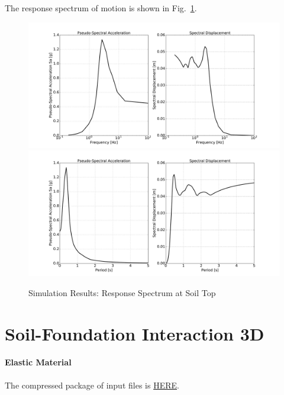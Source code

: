 The response spectrum of motion is shown in Fig.~\ref{fig_spectrum_freq_period_time_series_fr3d}.
\begin{figure}[H]
  \centering
  \includegraphics[width = 15cm]{./Figure-files/nonlinear_analysis_steps/free_field_3D/DRM3D_motion_node_4454_x_spectrum_freq.pdf}
  \includegraphics[width = 15cm]{./Figure-files/nonlinear_analysis_steps/free_field_3D/DRM3D_motion_node_4454_x_spectrum_period.pdf}
  \caption{Simulation Results: Response Spectrum at Soil Top}
  \label{fig_spectrum_freq_period_time_series_fr3d}
\end{figure}


\clearpage
\newpage
\section{Soil-Foundation Interaction 3D}
\label{foundation_3D}


\paragraph{Elastic Material}
The compressed package of input files is  
\href{https://github.com/yuan-energy/Real-ESSI-Short-Course-Examples/tree/master/short-course-examples/nonlinear_analysis_steps/soil-foundation/elastic/elastic.tgz?raw=true}{HERE}. 

